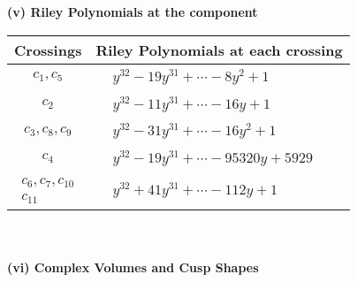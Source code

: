\documentclass[1p]{elsarticle_modified}
\theoremstyle{definition}
\begin{document}
\newpage\renewcommand{\arraystretch}{1}
\flushleft \textbf{(v) Riley Polynomials at the component}\newline \\
\begin{tabular}{m{50pt}|m{274pt}}
Crossings & \hspace{64pt}Riley Polynomials at each crossing \\
\hline $$\begin{aligned}c_{1},c_{5}\end{aligned}$$&$\begin{aligned}
&y^{32}-19 y^{31}+\cdots-8 y^2+1
\end{aligned}$\\
\hline $$\begin{aligned}c_{2}\end{aligned}$$&$\begin{aligned}
&y^{32}-11 y^{31}+\cdots-16 y+1
\end{aligned}$\\
\hline $$\begin{aligned}c_{3},c_{8},c_{9}\end{aligned}$$&$\begin{aligned}
&y^{32}-31 y^{31}+\cdots-16 y^2+1
\end{aligned}$\\
\hline $$\begin{aligned}c_{4}\end{aligned}$$&$\begin{aligned}
&y^{32}-19 y^{31}+\cdots-95320 y+5929
\end{aligned}$\\
\hline $$\begin{aligned}c_{6},c_{7},c_{10}\\c_{11}\end{aligned}$$&$\begin{aligned}
&y^{32}+41 y^{31}+\cdots-112 y+1
\end{aligned}$\\
\hline
\end{tabular}\\~\\
\newpage\flushleft \textbf{(vi) Complex Volumes and Cusp Shapes}
\end{document}
